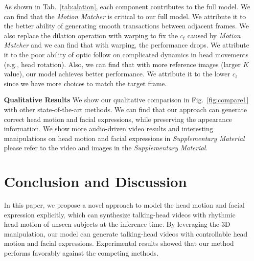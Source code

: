 \documentclass[runningheads]{llncs}
\begin{document}
As shown in Tab.~\ref{tab:alation}, each component contributes to the full model. We can find that the \textit{Motion Matcher} is critical to our full model. We attribute it to the better ability of generating smooth transactions between adjacent frames. We also replace the dilation operation with warping to fix the $c_t$ caused by \textit{Motion Matcher} and we can find that with warping, the performance drops. We attribute it to the poor ability of optic follow on complicated dynamics in head movements (e.g., head rotation). Also, we can find that with more reference images (larger $K$ value), our model achieves better performance. We attribute it to the lower $c_t$ since we have more choices to match the target frame. 

\noindent \textbf{Qualitative Results} \quad We show our qualitative comparison in Fig.~\ref{fig:compare1} with other state-of-the-art methods. We can find that our approach can generate correct head motion and facial expressions, while preserving the appearance information. We show more audio-driven video results and interesting manipulations on head motion and facial expressions in \textit{Supplementary Material}   please refer to the video and images in the \textit{Supplementary Material}.

\section{Conclusion and Discussion}
In this paper, we propose a novel approach to model the head motion and facial expression explicitly, which can synthesize talking-head videos with rhythmic head motion of unseen subjects at the inference time. By leveraging the 3D manipulation, our model can generate talking-head videos with controllable head motion and facial expressions. Experimental results showed that our method performs favorably against the competing methods.
  

\clearpage



\end{document}

